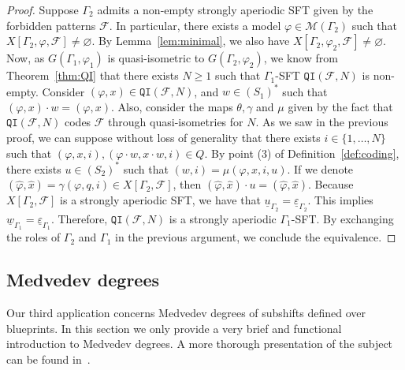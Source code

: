 \documentclass{article}
\theoremstyle{definition}
\theoremstyle{definition}
\newcommand{\M}{\mathcal{M}}
\newcommand{\Fo}{\mathcal{F}}
\newcommand{\QI}{\mathtt{QI}}
\begin{document}
\begin{proof}
    Suppose $\Gamma_2$ admits a non-empty strongly aperiodic SFT given by the forbidden patterns $\Fo$. In particular, there exists a model $\varphi\in\M(\Gamma_2)$ such that $X[\Gamma_2,\varphi,\Fo]\neq\varnothing$. By Lemma~\ref{lem:minimal}, we also have $X[\Gamma_2,\varphi_2,\Fo]\neq\varnothing$. Now, as $G(\Gamma_1, \varphi_1)$ is quasi-isometric to $G(\Gamma_2,\varphi_2)$, we know from Theorem~\ref{thm:QI} that there exists $N\geq 1$ such that $\Gamma_1$-SFT $\QI(\Fo, N)$ is non-empty. Consider $(\varphi, x)\in\QI(\Fo,N)$, and $w\in (S_1)^*$ such that $(\varphi, x)\cdot w = (\varphi, x)$. Also, consider the maps $\theta, \gamma$ and $\mu$ given by the fact that $\QI(\Fo, N)$ codes $\Fo$ through quasi-isometries for $N$. As we saw in the previous proof, we can suppose without loss of generality that there exists $i\in\{1,\dots,N\}$ such that $(\varphi, x, i), (\varphi\cdot w, x\cdot w, i)\in Q$. By point (3) of Definition~\ref{def:coding}, there exists $u\in(S_2)^*$ such that $(w,i) = \mu(\varphi,x,i,u)$. If we denote $(\widehat{\varphi},\widehat{x}) = \gamma(\varphi,q,i)\in X[\Gamma_2,\Fo]$, then $(\widehat{\varphi},\widehat{x})\cdot u = (\widehat{\varphi},\widehat{x})$. Because $X[\Gamma_2,\Fo]$ is a strongly aperiodic SFT, we have that $\underline{u}_{\Gamma_2} = \underline{\varepsilon}_{\Gamma_2}$. This implies $\underline{w}_{\Gamma_1} = \underline{\varepsilon}_{\Gamma_1}$. Therefore, $\QI(\Fo,N)$ is a strongly aperiodic $\Gamma_1$-SFT. By exchanging the roles of $\Gamma_2$ and $\Gamma_1$ in the previous argument, we conclude the equivalence.
\end{proof}


\subsection{Medvedev degrees}

Our third application concerns Medvedev degrees of subshifts defined over blueprints. In this section we only provide a very brief and functional introduction to Medvedev degrees. A more thorough presentation of the subject can be found in~\cite{barbieri2024medvedev}.
\end{document}
